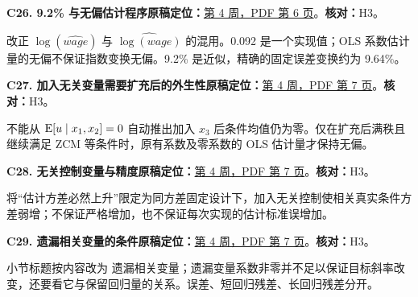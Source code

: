 \par\medskip\noindent\begin{minipage}{\linewidth}

\label{err:unbiased-log}

\textbf{C26. 9.2\% 与无偏估计程序}\quad\textbf{原稿定位：}\hyperref[src:w4p6]{第 4 周，PDF 第 6 页}。\quad\textbf{核对：}H3。\par

改正 $\log(\widehat{wage})$ 与 $\widehat{\log(wage)}$ 的混用。0.092 是一个实现值；OLS 系数估计量的无偏不保证指数变换无偏。9.2\% 是近似，精确的固定误差变换约为 9.64\%。

\end{minipage}\par

\par\medskip\noindent\begin{minipage}{\linewidth}

\label{err:irrelevant-exogeneity}

\textbf{C27. 加入无关变量需要扩充后的外生性}\quad\textbf{原稿定位：}\hyperref[src:w4p7]{第 4 周，PDF 第 7 页}。\quad\textbf{核对：}H3。\par

不能从 $\operatorname{E}[u\mid x_1,x_2]=0$ 自动推出加入 $x_3$ 后条件均值仍为零。仅在扩充后满秩且继续满足 ZCM 等条件时，原有系数及零系数的 OLS 估计量才保持无偏。

\end{minipage}\par

\par\medskip\noindent\begin{minipage}{\linewidth}

\label{err:irrelevant-variance}

\textbf{C28. 无关控制变量与精度}\quad\textbf{原稿定位：}\hyperref[src:w4p7]{第 4 周，PDF 第 7 页}。\quad\textbf{核对：}H3。\par

将“估计方差必然上升”限定为同方差固定设计下，加入无关控制使相关真实条件方差弱增；不保证严格增加，也不保证每次实现的估计标准误增加。

\end{minipage}\par

\par\medskip\noindent\begin{minipage}{\linewidth}

\label{err:omitting-relevant}

\textbf{C29. 遗漏相关变量的条件}\quad\textbf{原稿定位：}\hyperref[src:w4p7]{第 4 周，PDF 第 7 页}。\quad\textbf{核对：}H3。\par

小节标题按内容改为 遗漏相关变量；遗漏变量系数非零并不足以保证目标斜率改变，还要看它与保留回归量的关系。误差、短回归残差、长回归残差分开。

\end{minipage}\par

